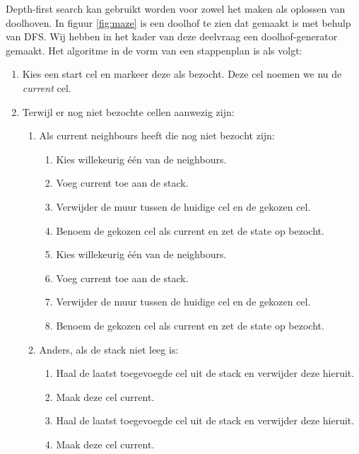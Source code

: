 Depth-first search kan gebruikt worden voor zowel het maken als oplossen van doolhoven. In figuur \ref{fig:maze} is een doolhof te zien dat gemaakt is met behulp van DFS. Wij hebben in het kader van deze deelvraag een doolhof-generator gemaakt. Het algoritme in de vorm van een stappenplan is als volgt:

\begin{enumerate}
\item Kies een start cel en markeer deze als bezocht. Deze cel noemen we nu de \textit{current} cel.
\item Terwijl er nog niet bezochte cellen aanwezig zijn:
	\begin{enumerate}
	\item Als current neighbours heeft die nog niet bezocht zijn:
		\begin{enumerate}
		\item Kies willekeurig \'e\'en van de neighbours.
		\item Voeg current toe aan de stack.
		\item Verwijder de muur tussen de huidige cel en de gekozen cel.
		\item Benoem de gekozen cel als current en zet de state op bezocht.
		\item Kies willekeurig \'e\'en van de neighbours.
		\item Voeg current toe aan de stack.
		\item Verwijder de muur tussen de huidige cel en de gekozen cel.
		\item Benoem de gekozen cel als current en zet de state op bezocht.
		\end{enumerate}			
	
	\item Anders, als de stack niet leeg is:
		\begin{enumerate}
		\item Haal de laatst toegevoegde cel uit de stack en verwijder deze hieruit.
		\item Maak deze cel current.
		\item Haal de laatst toegevoegde cel uit de stack en verwijder deze hieruit.
		\item Maak deze cel current.
		\end{enumerate}	
	\end{enumerate}
\end{enumerate}
